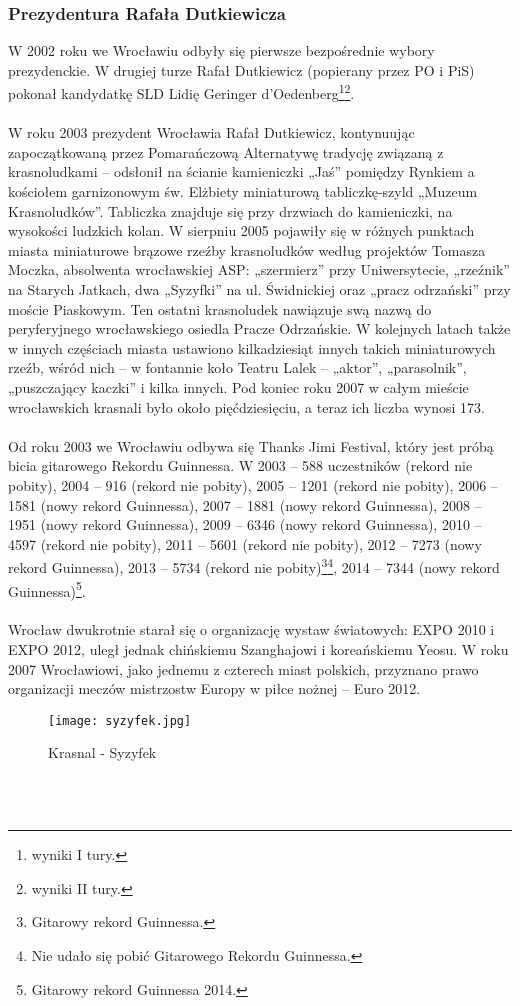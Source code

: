 \documentclass[12pt]{article}
\begin{document}
\subsubsection{Prezydentura Rafała Dutkiewicza}

W 2002 roku we Wrocławiu odbyły się pierwsze bezpośrednie wybory prezydenckie. W drugiej turze Rafał Dutkiewicz (popierany przez PO i PiS) pokonał kandydatkę SLD Lidię Geringer d’Oedenberg\footnote{wyniki I tury.}\footnote{wyniki II tury.}.\\\\
W roku 2003 prezydent Wrocławia Rafał Dutkiewicz, kontynuując zapoczątkowaną przez Pomarańczową Alternatywę tradycję związaną z krasnoludkami – odsłonił na ścianie kamieniczki „Jaś” pomiędzy Rynkiem a kościołem garnizonowym św. Elżbiety miniaturową tabliczkę-szyld „Muzeum Krasnoludków”. Tabliczka znajduje się przy drzwiach do kamieniczki, na wysokości ludzkich kolan. W sierpniu 2005 pojawiły się w różnych punktach miasta miniaturowe brązowe rzeźby krasnoludków według projektów Tomasza Moczka, absolwenta wrocławskiej ASP: „szermierz” przy Uniwersytecie, „rzeźnik” na Starych Jatkach, dwa „Syzyfki” na ul. Świdnickiej oraz „pracz odrzański” przy moście Piaskowym. Ten ostatni krasnoludek nawiązuje swą nazwą do peryferyjnego wrocławskiego osiedla Pracze Odrzańskie. W kolejnych latach także w innych częściach miasta ustawiono kilkadziesiąt innych takich miniaturowych rzeźb, wśród nich – w fontannie koło Teatru Lalek – „aktor”, „parasolnik”, „puszczający kaczki” i kilka innych. Pod koniec roku 2007 w całym mieście wrocławskich krasnali było około pięćdziesięciu, a teraz ich liczba wynosi 173.\\\\
Od roku 2003 we Wrocławiu odbywa się Thanks Jimi Festival, który jest próbą bicia gitarowego Rekordu Guinnessa. W 2003 – 588 uczestników (rekord nie pobity), 2004 – 916 (rekord nie pobity), 2005 – 1201 (rekord nie pobity), 2006 – 1581 (nowy rekord Guinnessa), 2007 – 1881 (nowy rekord Guinnessa), 2008 – 1951 (nowy rekord Guinnessa), 2009 – 6346 (nowy rekord Guinnessa), 2010 – 4597 (rekord nie pobity), 2011 – 5601 (rekord nie pobity), 2012 – 7273 (nowy rekord Guinnessa), 2013 – 5734 (rekord nie pobity)\footnote{Gitarowy rekord Guinnessa.}\footnote{Nie udało się pobić Gitarowego Rekordu Guinnessa.}, 2014 – 7344 (nowy rekord Guinnessa)\footnote{Gitarowy rekord Guinnessa 2014.}.\\\\
Wrocław dwukrotnie starał się o organizację wystaw światowych: EXPO 2010 i EXPO 2012, uległ jednak chińskiemu Szanghajowi i koreańskiemu Yeosu. W roku 2007 Wrocławiowi, jako jednemu z czterech miast polskich, przyznano prawo organizacji meczów mistrzostw Europy w piłce nożnej – Euro 2012.
\begin{figure}[h]
    \centering
    \texttt{[image: syzyfek.jpg]}
    \caption{Krasnal - Syzyfek}
    \label{fig:syzyfek}
\end{figure}\\\\
\end{document}
